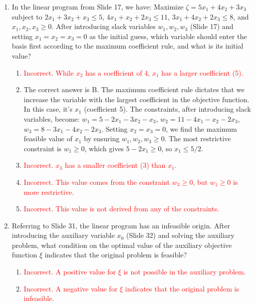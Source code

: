 \documentclass{article}%
\newcommand{\incorrect}[1]{\textcolor{red}{#1}}
\begin{document}
\begin{enumerate}
\begin{enumerate}
\end{enumerate}%
\vspace{1em}%
\item In the linear program from Slide 17, we have: Maximize $ \zeta = 5x_1 + 4x_2 + 3x_3 $ subject to $ 2x_1 + 3x_2 + x_3 \le 5 $, $ 4x_1 + x_2 + 2x_3 \le 11 $, $ 3x_1 + 4x_2 + 2x_3 \le 8 $, and $ x_1, x_2, x_3 \ge 0 $.  After introducing slack variables $ w_1, w_2, w_3 $ (Slide 17) and setting $ x_1 = x_2 = x_3 = 0 $ as the initial guess, which variable should enter the basis first according to the maximum coefficient rule, and what is its initial value?%
\begin{enumerate}%
\item \incorrect{Incorrect. While $ x_2 $ has a coefficient of 4, $ x_1 $ has a larger coefficient (5).}%
\item The correct answer is B. The maximum coefficient rule dictates that we increase the variable with the largest coefficient in the objective function. In this case, it's $ x_1 $ (coefficient 5).  The constraints, after introducing slack variables, become: $ w_1 = 5 - 2x_1 - 3x_2 - x_3 $, $ w_2 = 11 - 4x_1 - x_2 - 2x_3 $, $ w_3 = 8 - 3x_1 - 4x_2 - 2x_3 $. Setting $ x_2 = x_3 = 0 $, we find the maximum feasible value of $ x_1 $ by ensuring $ w_1, w_2, w_3 \ge 0 $. The most restrictive constraint is $ w_1 \ge 0 $, which gives $ 5 - 2x_1 \ge 0 $, so $ x_1 \le 5/2 $.%
\item \incorrect{Incorrect. $ x_3 $ has a smaller coefficient (3) than $ x_1 $.}%
\item \incorrect{Incorrect. This value comes from the constraint $ w_3 \ge 0 $, but $ w_1 \ge 0 $ is more restrictive.}%
\item \incorrect{Incorrect. This value is not derived from any of the constraints.}%
\end{enumerate}%
\vspace{1em}%
\item Referring to Slide 31, the linear program has an infeasible origin.  After introducing the auxiliary variable $ x_0 $ (Slide 32) and solving the auxiliary problem, what condition on the optimal value of the auxiliary objective function $ \xi $ indicates that the original problem is feasible?%
\begin{enumerate}%
\item \incorrect{Incorrect. A positive value for $ \xi $ is not possible in the auxiliary problem.}%
\item \incorrect{Incorrect. A negative value for $ \xi $ indicates that the original problem is infeasible.}%

\end{enumerate}
\end{enumerate}
\end{document}
